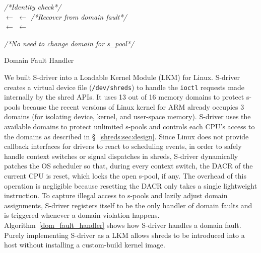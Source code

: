 \IncMargin{1em}
\begin{algorithm}
\small
{}
\BlankLine
\emph{/*Identity check*/}\\
  \Spool$\leftarrow$ \;
  \Owner$\leftarrow$ \GetOwner{$\Spool$}\;
\BlankLine
\emph{/*Recover from domain fault*/}\\
  \CPUDomain$\leftarrow$ \GetCPUDomain{}\;
  \SpoolDomain$\leftarrow$ \GetSpoolDomain{\Spool}\;
   {
   		  
          \If{\CPUDomain $=$ \SpoolDomain}
          {
            \emph{/*No need to change domain for s\_pool*/} \\
            \RestoreDACR{}\;
          }
          \Else
   		  {
   		    \AdjustSPool{\CPUDomain}  
   		  }
   }
    \Else
    {
    	\UnlockSPool{\CPUDomain} 
    }
   \LockActiveSPoolList{\Spool}\;
\caption{Domain Fault Handler}\label{dom_fault_handler}
\end{algorithm}
\DecMargin{1em}

We built S-driver into a Loadable Kernel Module (LKM) for Linux. 
S-driver creates a virtual device file ({\tt /dev/shreds}) to handle the {\tt ioctl} requests made internally by the shred APIs. 
It uses 13 out of 16 memory domains to protect s-pools because the recent versions of Linux kernel for ARM already occupies 3 domains (for isolating device, kernel, and user-space memory). 
S-driver uses the available domains to protect unlimited s-pools and controls each CPU's access to the domains as described in \S~\ref{shreds:sec:design}.
Since Linux does not provide callback interfaces for drivers to react to scheduling events, in order to safely handle context switches or signal dispatches in shreds, 
S-driver dynamically patches the OS scheduler so that, during every context switch, the DACR of the current CPU is reset, which locks the open s-pool, if any. 
The overhead of this operation is negligible because resetting the DACR only takes a single lightweight instruction. 
To capture illegal access to s-pools and lazily adjust domain assignments, 
S-driver registers itself to be the only handler of domain faults and is triggered whenever a domain violation happens. 
Algorithm~\ref{dom_fault_handler} shows how S-driver handles a domain fault. 
Purely implementing S-driver as a LKM allows shreds to be introduced into a host without installing a custom-build kernel image.
